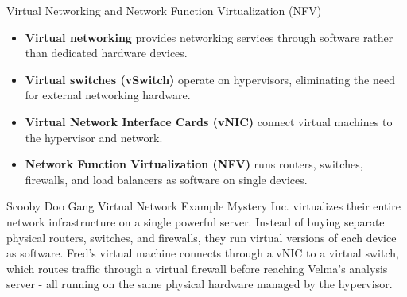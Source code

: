 \documentclass[aspectratio=169]{beamer}
\begin{document}
	\begin{frame}{Virtual Networking and Network Function Virtualization (NFV)}
		\begin{itemize}
			\item \textbf{Virtual networking} provides networking services through software rather than dedicated hardware devices.
			\item \textbf{Virtual switches (vSwitch)} operate on hypervisors, eliminating the need for external networking hardware.
			\item \textbf{Virtual Network Interface Cards (vNIC)} connect virtual machines to the hypervisor and network.
			\item \textbf{Network Function Virtualization (NFV)} runs routers, switches, firewalls, and load balancers as software on single devices.
		\end{itemize}
		
		\begin{exampleblock}{Scooby Doo Gang Virtual Network Example}
			Mystery Inc. virtualizes their entire network infrastructure on a single powerful server. Instead of buying separate physical routers, switches, and firewalls, they run virtual versions of each device as software. Fred's virtual machine connects through a vNIC to a virtual switch, which routes traffic through a virtual firewall before reaching Velma's analysis server - all running on the same physical hardware managed by the hypervisor.
		\end{exampleblock}
	\end{frame}
	
\end{document}

